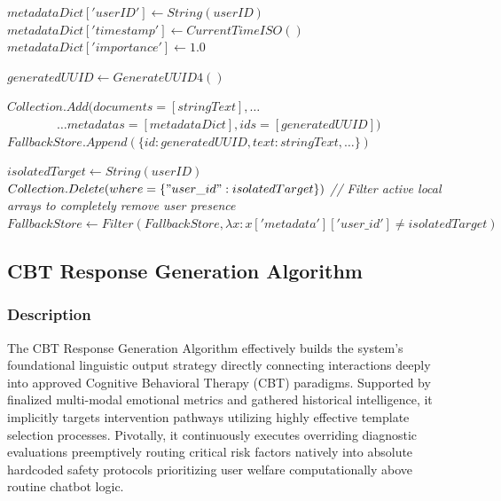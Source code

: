 \documentclass[11pt]{report}
\begin{document}
\begin{algorithm}[H]
\caption{Inject Vector Memory Node Schema}
\label{alg:memory_inject}
\begin{algorithmic}[1]
    \State $metadataDict['userID'] \gets String(userID)$
    \State $metadataDict['timestamp'] \gets CurrentTimeISO()$
        \State $metadataDict['importance'] \gets 1.0$
    \EndIf
    
    \State $generatedUUID \gets GenerateUUID4()$
    
        \State $Collection.Add(documents=[stringText], \dots$
        \State $\quad \quad \quad \quad \dots metadatas=[metadataDict], ids=[generatedUUID])$
    \Else
        \State $FallbackStore.Append(\{id:generatedUUID, text:stringText, \dots\})$
    \EndIf
\EndProcedure
\end{algorithmic}
\end{algorithm}

\begin{algorithm}[H]
\caption{Wipe Target User Semantic Schemas}
\label{alg:memory_wipe}
\begin{algorithmic}[1]
    \State $isolatedTarget \gets String(userID)$
        \State $Collection.Delete(where=\{"user\_id": isolatedTarget\})$
    \Else
        \State \textit{// Filter active local arrays to completely remove user presence}
        \State $FallbackStore \gets Filter(FallbackStore, \lambda x: x['metadata']['user\_id'] \neq isolatedTarget)$
    \EndIf
\EndProcedure
\end{algorithmic}
\end{algorithm}

\subsection{CBT Response Generation Algorithm}

\subsubsection*{Description}
The CBT Response Generation Algorithm effectively builds the system's foundational linguistic output strategy directly connecting interactions deeply into approved Cognitive Behavioral Therapy (CBT) paradigms. Supported by finalized multi-modal emotional metrics and gathered historical intelligence, it implicitly targets intervention pathways utilizing highly effective template selection processes. Pivotally, it continuously executes overriding diagnostic evaluations preemptively routing critical risk factors natively into absolute hardcoded safety protocols prioritizing user welfare computationally above routine chatbot logic.
\end{document}
